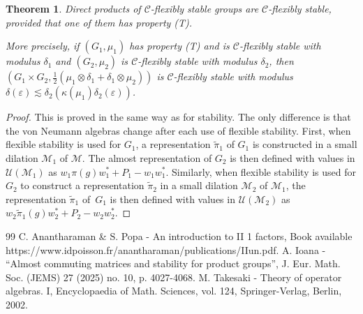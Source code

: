 \documentclass[10pt]{amsart}
\theoremstyle{plain}
\newtheorem{theorem}{Theorem}[section]
\theoremstyle{definition}
\newcommand{\cM}{\mathcal{M}}
\newcommand{\vn}{\mathcal{C}}
\newcommand{\cU}{\mathcal{U}}
\numberwithin{equation}{section}
\begin{document}
\begin{theorem}\label{thm:flexible_stability_direct_product} Direct products of $\vn$-flexibly stable groups are $\vn$-flexibly stable, provided that one of them has property (T).

More precisely, if $(G_1,\mu_1)$ has property (T) and is $\vn$-flexibly stable with modulus $\delta_1$ and $(G_2,\mu_2)$ is $\vn$-flexibly stable with modulus $\delta_2$, then $(G_1 \times G_2,\frac{1}{2}(\mu_1 \otimes \delta_1 + \delta_1 \otimes \mu_2))$ is $\vn$-flexibly stable with modulus $\delta(\varepsilon) \lesssim \delta_2(\kappa(\mu_1) \delta_2(\varepsilon))$.
\end{theorem}
\begin{proof}
This is proved in the same way as for stability. The only difference is that the von Neumann algebras change after each use of flexible stability. First, when flexible stability is used for $G_1$, a representation $\tilde{\pi}_1$ of $G_1$ is constructed in a small dilation $\cM_1$ of $\cM$. The almost representation of $G_2$ is then defined with values in $\cU(\cM_1)$ as $w_1 \pi(g) w_1^* +P_1 - w_1w_1^*$. Similarly, when flexible stability is used for $G_2$ to construct a representation $\tilde{\pi}_2$ in a small dilation $\cM_2$ of $\cM_1$, the representation $\tilde{\pi}_1$ of~$G_1$ is then defined with values in $\cU(\cM_2)$ as
$w_2 \tilde{\pi}_1(g) w_2^* +P_2 - w_2w_2^*$.
\end{proof}
\begin{thebibliography}{99}
 C. Anantharaman \& S. Popa - An introduction to II 1 factors, Book available https://www.idpoisson.fr/anantharaman/publications/IIun.pdf.
 A. Ioana - “Almost commuting matrices and stability for product groups”, J. Eur. Math. Soc. (JEMS) 27 (2025) no. 10, p. 4027-4068.
 M. Takesaki - Theory of operator algebras. I, Encyclopaedia of Math. Sciences, vol. 124, Springer-Verlag, Berlin, 2002.
\end{thebibliography}
\end{document}
